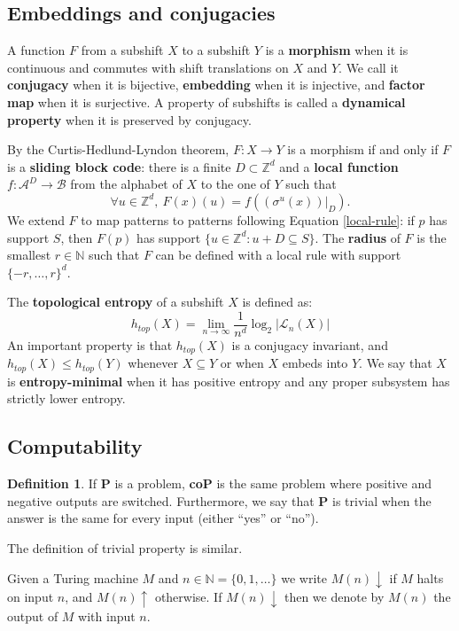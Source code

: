 \documentclass[a4paper]{article}
\newcommand{\Le}{\mathcal{L}}
\newcommand{\Z}{\mathbb{Z}}
\newcommand{\Zd}{\mathbb{Z}^d}
\newcommand{\N}{\mathbb{N}}
\newcommand{\A}{\mathcal{A}}
\newcommand{\B}{\mathcal{B}}
\theoremstyle{definition}
\newtheorem{definition}[theorem]{Definition}
\begin{document}
\subsection{Embeddings and conjugacies}
A function $F$ from a subshift $X$ to a subshift $Y$ is a \textbf{morphism} when it is continuous and commutes with shift translations on $X$ and $Y$. We call it  \textbf{conjugacy} when it is bijective, \textbf{embedding} when it is injective, and \textbf{factor map} when it is surjective. A property of subshifts is called  a \textbf{dynamical property} when it is preserved by conjugacy. 

By the Curtis-Hedlund-Lyndon theorem, $F\colon X\to Y$ is a morphism if and only if $F$ is a \textbf{sliding block code}: there is a finite $D\subset \Zd$ and a \textbf{local function} $f\colon \A^{D}\to \B$ from the alphabet of $X$ to the one of $Y$ such that
\begin{equation}\label{local-rule}
\forall u\in \Z^d,\ F(x)(u)=f((\sigma^u(x))|_{D}).
\end{equation}
We extend $F$ to map patterns to patterns following Equation \ref{local-rule}: if $p$ has support $S$, then $F(p)$ has support $\{u\in\Z^d : u+D\subseteq S\}$.
The \textbf{radius} of $F$ is the smallest $r\in\N$ such that $F$ can be defined with a local rule with support $\{-r,\dots,r\}^d$. 



The \textbf{topological entropy} of a subshift $X$ is defined as:
\[h_{top}(X)=\lim_{n\to\infty}\frac{1}{n^d}\log_2 |\Le_n(X)|\]
An important property is that $h_{top}(X)$ is a conjugacy invariant, and $h_{top}(X)\leq h_{top}(Y)$ whenever $X\subseteq Y$ or when $X$ embeds into $Y$. 
We say that $X$ is \textbf{entropy-minimal} when it has positive entropy and any proper subsystem has strictly lower entropy. 


\subsection{Computability}

\begin{definition}
    If \textbf{P} is a problem, \textbf{coP} is the same problem where positive and negative outputs are switched. Furthermore, we say that $\textbf{P}$ is trivial when the answer is the same for every input (either ``yes'' or ``no'').
\end{definition}
The definition of trivial property is similar. 

Given a Turing machine $M$ and $n\in\N=\{0,1,\dots\}$ we write  $M(n)\downarrow$ if $M$ halts on input $n$, and $M(n)\uparrow$ otherwise. If $M(n)\downarrow$ then we denote by $M(n)$ the output of $M$ with input $n$. 
\end{document}
